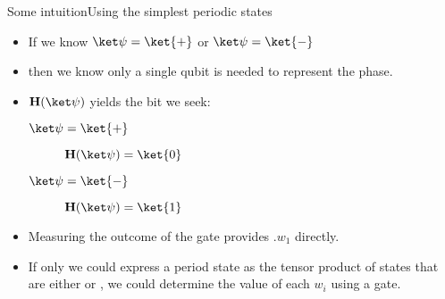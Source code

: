 \begin{frame}{Some intuition}{Using the simplest periodic states}

\begin{itemize}[<+->]
    \item If we know $\QState{}=\ket{+}$ or $\QState{}=\ket{-}$
    \item then we know only a single qubit is needed to represent the phase.
    \item $\Hadamard(\QState{})$ yields the bit we seek:
    \begin{description}
        \item[$\QState{}=\ket{+}$] $\Hadamard(\QState{}) = \ket{0}$
        \item[$\QState{}=\ket{-}$] $\Hadamard(\QState{}) = \ket{1}$
    \end{description}
    \item Measuring the outcome of the \Hadamard{} gate provides $.w_{1}$ directly.
    \item If only we could express a period state as the tensor product of states that are either \ket{+} or \ket{-}, we could determine the value of each $w_{i}$ using a \Hadamard{} gate.
\end{itemize}
    
\end{frame}

